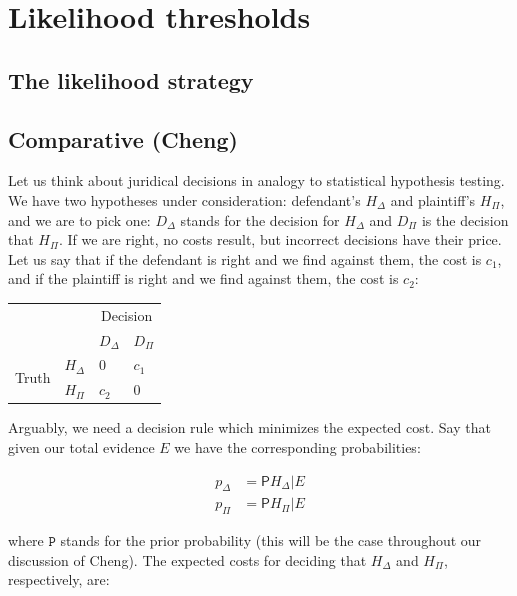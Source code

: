 \documentclass[10pt,dvipsnames,enabledeprecatedfontcommands]{scrartcl}
\newcommand{\pr}{\mathsf{P}}
\begin{document}
\section{Likelihood thresholds}\label{likelihood-thresholds}

\subsection{The likelihood strategy}\label{the-likelihood-strategy}

\subsection{Comparative (Cheng)}\label{comparative-cheng}

Let us think about juridical decisions in analogy to statistical
hypothesis testing. We have two hypotheses under consideration:
defendant's \(H_\Delta\) and plaintiff's \(H_\Pi\), and we are to pick
one: \(D_\Delta\) stands for the decision for \(H_\Delta\) and \(D_\Pi\)
is the decision that \(H_\Pi\). If we are right, no costs result, but
incorrect decisions have their price. Let us say that if the defendant
is right and we find against them, the cost is \(c_1\), and if the
plaintiff is right and we find against them, the cost is \(c_2\):

\begin{center}
\begin{tabular}
{@{}llll@{}}
\toprule
& & \multicolumn{2}{c}{Decision}\\
& &  $D_\Delta$ & $D_\Pi$ \\
\cmidrule{3-4}
\multirow{2}{*}{Truth} &  $H_\Delta$    & $0$    & $c_1$\\
                       &  $H_\Pi$       &  $c_2$   & $0$ \\ 
\bottomrule
\end{tabular}
\end{center}

\noindent Arguably, we need a decision rule which minimizes the expected
cost. Say that given our total evidence \(E\) we have the corresponding
probabilities:

\begin{align*}
p_\Delta &= \pr{H_\Delta \vert E} \\
p_\Pi & = \pr{H_\Pi \vert E}
\end{align*}

\noindent where \(\mathtt{P}\) stands for the prior probability (this
will be the case throughout our discussion of Cheng). The expected costs
for deciding that \(H_\Delta\) and \(H_\Pi\), respectively, are:
\end{document}
